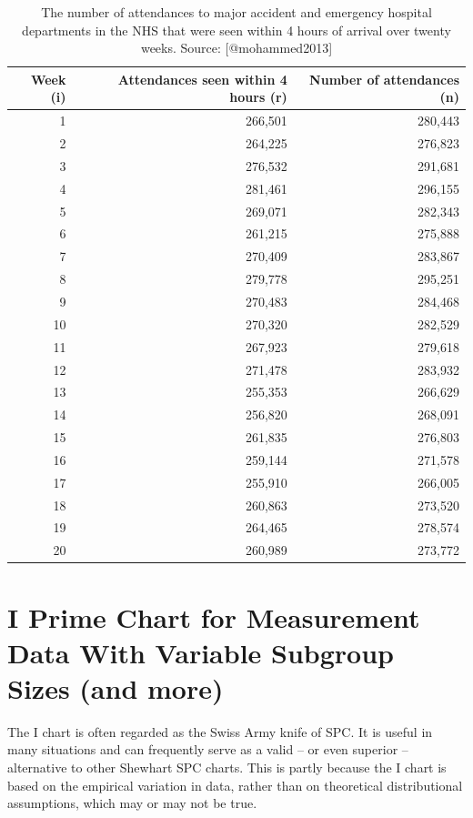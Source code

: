 \documentclass[
]{book}
\begin{document}
\begin{table}

\caption{\label{tab:pcharts-tab1}The number of attendances to major accident and emergency hospital departments in the NHS that were seen within 4 hours of arrival over twenty weeks. Source: [@mohammed2013]}
\centering
\begin{tabular}[t]{r|r|r}
\hline
Week (i) & Attendances seen within 4 hours (r) & Number of attendances (n)\\
\hline
1 & 266,501 & 280,443\\
\hline
2 & 264,225 & 276,823\\
\hline
3 & 276,532 & 291,681\\
\hline
4 & 281,461 & 296,155\\
\hline
5 & 269,071 & 282,343\\
\hline
6 & 261,215 & 275,888\\
\hline
7 & 270,409 & 283,867\\
\hline
8 & 279,778 & 295,251\\
\hline
9 & 270,483 & 284,468\\
\hline
10 & 270,320 & 282,529\\
\hline
11 & 267,923 & 279,618\\
\hline
12 & 271,478 & 283,932\\
\hline
13 & 255,353 & 266,629\\
\hline
14 & 256,820 & 268,091\\
\hline
15 & 261,835 & 276,803\\
\hline
16 & 259,144 & 271,578\\
\hline
17 & 255,910 & 266,005\\
\hline
18 & 260,863 & 273,520\\
\hline
19 & 264,465 & 278,574\\
\hline
20 & 260,989 & 273,772\\
\hline
\end{tabular}
\end{table}

\chapter{I Prime Chart for Measurement Data With Variable Subgroup Sizes (and more)}\label{i-prime-chart-for-measurement-data-with-variable-subgroup-sizes-and-more}

The I chart is often regarded as the Swiss Army knife of SPC. It is useful in many situations and can frequently serve as a valid -- or even superior -- alternative to other Shewhart SPC charts. This is partly because the I chart is based on the empirical variation in data, rather than on theoretical distributional assumptions, which may or may not be true.
\end{document}
